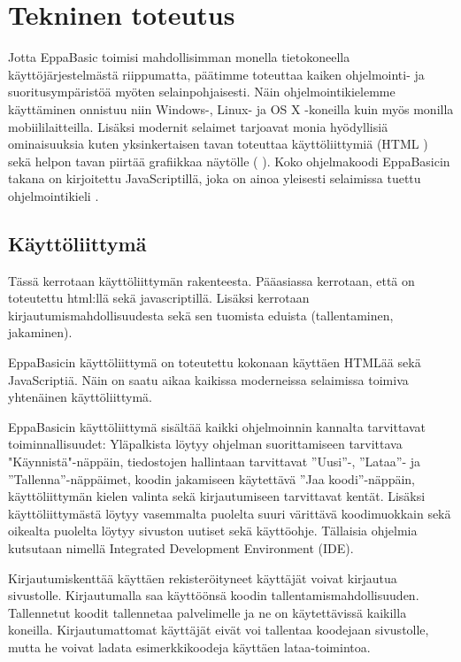 
\section{Tekninen toteutus}

Jotta EppaBasic toimisi mahdollisimman monella tietokoneella käyttöjärjestelmästä riippumatta,
päätimme toteuttaa kaiken ohjelmointi- ja suoritusympäristöä myöten selainpohjaisesti.
Näin ohjelmointikielemme käyttäminen onnistuu niin Windows-, Linux- ja OS X -koneilla
kuin myös monilla mobiililaitteilla.
Lisäksi modernit selaimet tarjoavat monia hyödyllisiä ominaisuuksia
kuten yksinkertaisen tavan toteuttaa käyttöliittymiä (HTML \cite{w3c_html})
sekä helpon tavan piirtää grafiikkaa näytölle ( \cite{mdn_canvas}).
Koko ohjelmakoodi EppaBasicin takana on kirjoitettu JavaScriptillä,
joka on ainoa yleisesti selaimissa tuettu ohjelmointikieli \cite{mdn_about_js}.

\subsection{Käyttöliittymä}
\begin{anfxnote}{}
Tässä kerrotaan käyttöliittymän rakenteesta.
Pääasiassa kerrotaan, että on toteutettu html:llä sekä javascriptillä.
Lisäksi kerrotaan kirjautumismahdollisuudesta sekä
sen tuomista eduista (tallentaminen, jakaminen).
\end{anfxnote}

EppaBasicin käyttöliittymä on toteutettu kokonaan käyttäen HTMLää sekä JavaScriptiä.
Näin on saatu aikaa kaikissa moderneissa selaimissa toimiva yhtenäinen käyttöliittymä.

EppaBasicin käyttöliittymä sisältää kaikki ohjelmoinnin kannalta tarvittavat toiminnallisuudet:
Yläpalkista löytyy ohjelman suorittamiseen tarvittava "Käynnistä"-näppäin,
tiedostojen hallintaan tarvittavat ''Uusi''-, ''Lataa''- ja ''Tallenna''-näppäimet,
koodin jakamiseen käytettävä ''Jaa koodi''-näppäin,
käyttöliittymän kielen valinta
sekä kirjautumiseen tarvittavat kentät.
Lisäksi käyttöliittymästä löytyy vasemmalta puolelta suuri värittävä koodimuokkain
sekä oikealta puolelta löytyy sivuston uutiset sekä käyttöohje.
Tällaisia ohjelmia kutsutaan nimellä Integrated Development Environment (IDE).

Kirjautumiskenttää käyttäen rekisteröityneet käyttäjät voivat kirjautua sivustolle.
Kirjautumalla saa käyttöönsä koodin tallentamismahdollisuuden.
Tallennetut koodit tallennetaa palvelimelle
ja ne on käytettävissä kaikilla koneilla.
Kirjautumattomat käyttäjät eivät voi tallentaa koodejaan sivustolle,
mutta he voivat ladata esimerkkikoodeja käyttäen lataa-toimintoa.


